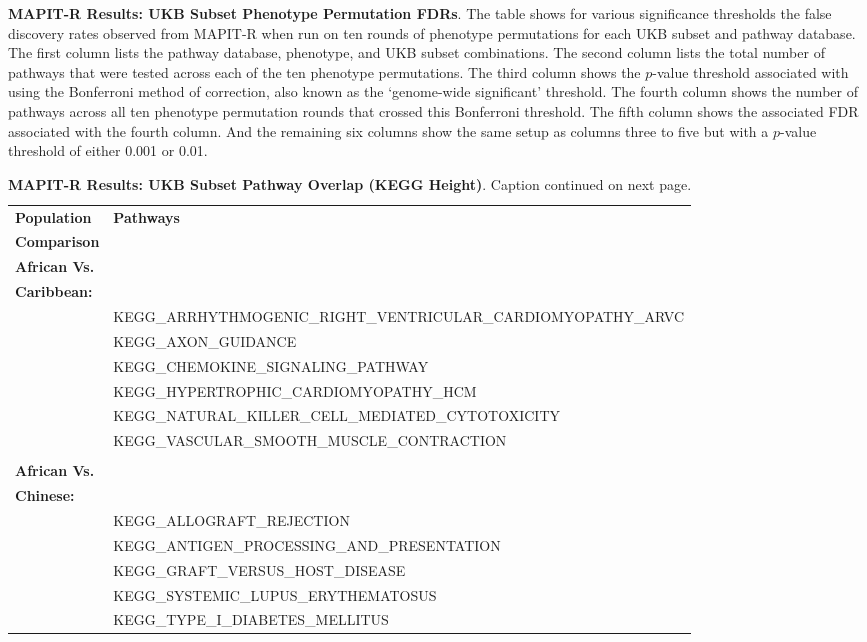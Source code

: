 \documentclass[12pt, a4paper]{article}
\begin{document}
\addtocounter{table}{-1}
\begin{table} [t!]
  \caption{\textbf{MAPIT-R Results: UKB Subset Phenotype Permutation FDRs}. The table shows for various significance thresholds the false discovery rates observed from MAPIT-R when run on ten rounds of phenotype permutations for each UKB subset and pathway database. The first column lists the pathway database, phenotype, and UKB subset combinations. The second column lists the total number of pathways that were tested across each of the ten phenotype permutations. The third column shows the $p$-value threshold associated with using the Bonferroni method of correction, also known as the `genome-wide significant' threshold. The fourth column shows the number of pathways across all ten phenotype permutation rounds that crossed this Bonferroni threshold. The fifth column shows the associated FDR associated with the fourth column. And the remaining six columns show the same setup as columns three to five but with a $p$-value threshold of either 0.001 or 0.01.}
\label{InterPath-Supp-Tables-AllPops-FDRs-Caption}
\end{table}
\clearpage

\setlength{\footskip}{2cm}
\begin{landscape}
\begin{table}[ht]
\centering
\begin{tabular}{ll}
  \hline
 \textbf{Population} & \textbf{Pathways}\\
 \textbf{Comparison} & \\
  \hline
\textbf{African Vs.} & \\
\textbf{Caribbean:} & \\
 & KEGG\_ARRHYTHMOGENIC\_RIGHT\_VENTRICULAR\_CARDIOMYOPATHY\_ARVC \\
 & KEGG\_AXON\_GUIDANCE \\
 & KEGG\_CHEMOKINE\_SIGNALING\_PATHWAY \\
 & KEGG\_HYPERTROPHIC\_CARDIOMYOPATHY\_HCM \\
 & KEGG\_NATURAL\_KILLER\_CELL\_MEDIATED\_CYTOTOXICITY \\
 & KEGG\_VASCULAR\_SMOOTH\_MUSCLE\_CONTRACTION \\
\\
\textbf{African Vs.} & \\
\textbf{Chinese:} & \\
 & KEGG\_ALLOGRAFT\_REJECTION \\
 & KEGG\_ANTIGEN\_PROCESSING\_AND\_PRESENTATION \\
 & KEGG\_GRAFT\_VERSUS\_HOST\_DISEASE \\
 & KEGG\_SYSTEMIC\_LUPUS\_ERYTHEMATOSUS \\
 & KEGG\_TYPE\_I\_DIABETES\_MELLITUS \\
   \hline
\end{tabular}
\caption[TBD]{\textbf{MAPIT-R Results: UKB Subset Pathway Overlap (KEGG Height)}. Caption continued on next page. }
\label{InterPath-Supp-Tables-MAPITR-TopPathway-Overlap}
\end{table}
\end{landscape}
\clearpage
\setlength{\footskip}{1cm}
\end{document}
